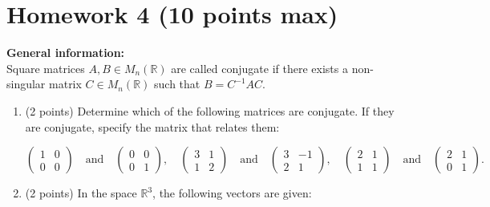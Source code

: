 \documentclass{article}
\begin{document}
\section*{Homework 4 (10 points max)}

\noindent\textbf{General information:} \\
Square matrices $A, B \in M_n(\mathbb{R})$ are called conjugate 
if there exists a non-singular matrix $C \in M_n(\mathbb{R})$ 
such that $B = C^{-1}AC$. \\

\begin{enumerate}
  \item (2 points) Determine which of the following matrices are conjugate. 
  If they are conjugate, specify the matrix that relates them:

  \[
  \begin{pmatrix}
  1 & 0 \\ 
  0 & 0
  \end{pmatrix}
  \quad \text{and} \quad
  \begin{pmatrix}
  0 & 0 \\
  0 & 1
  \end{pmatrix}
  , \quad
  \begin{pmatrix}
  3 & 1 \\
  1 & 2
  \end{pmatrix}
  \quad \text{and} \quad
  \begin{pmatrix}
  3 & -1  \\
  2 & 1
  \end{pmatrix}
  , \quad
  \begin{pmatrix}
  2 & 1 \\
  1 & 1
  \end{pmatrix}
  \quad \text{and} \quad
  \begin{pmatrix}
  2 & 1  \\
  0 & 1
  \end{pmatrix}
  .
  \]
  
  \item (2 points) In the space $\mathbb{R}^3$, the following vectors are given:
  

\end{enumerate}
\end{document}
